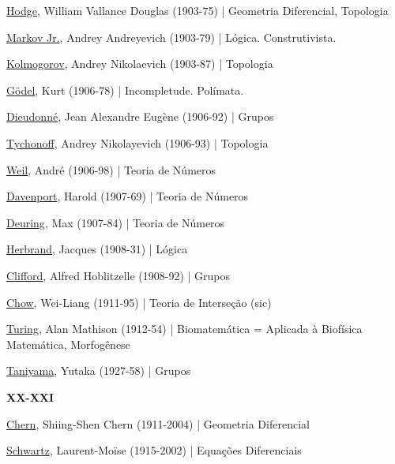 \documentclass[12pt,a4paper]{article}
\begin{document}
			\href{http://en.wikipedia.org/wiki/W._V._D._Hodge}{Hodge}, William Vallance Douglas (1903-75) | Geometria Diferencial, Topologia

			\href{http://en.wikipedia.org/wiki/Andrey_Markov_(Soviet_mathematician)}{Markov Jr.}, Andrey Andreyevich (1903-79) | L\'ogica. Construtivista.

			\href{http://en.wikipedia.org/wiki/Andrey_Kolmogorov}{Kolmogorov}, Andrey Nikolaevich (1903-87) | Topologia

			\href{http://pt.wikipedia.org/wiki/Kurt_G\%C3\%B6del}{Gödel}, Kurt (1906-78) | Incompletude. Pol\'imata.

			\href{http://en.wikipedia.org/wiki/Jean_Dieudonn\%C3\%A9}{Dieudonn\'e}, Jean Alexandre Eugène (1906-92) | Grupos

			\href{http://en.wikipedia.org/wiki/Andrey_Nikolayevich_Tychonoff}{Tychonoff}, Andrey Nikolayevich (1906-93) | Topologia

			\href{http://en.wikipedia.org/wiki/Andr\%C3\%A9_Weil}{Weil}, Andr\'e (1906-98) | Teoria de N\'umeros

			\href{http://en.wikipedia.org/wiki/Harold_Davenport}{Davenport}, Harold (1907-69) | Teoria de N\'umeros

			\href{http://en.wikipedia.org/wiki/Max_Deuring}{Deuring}, Max (1907-84) | Teoria de N\'umeros

			\href{http://en.wikipedia.org/wiki/Herbrand}{Herbrand}, Jacques (1908-31) | L\'ogica

			\href{http://en.wikipedia.org/wiki/Alfred_H._Clifford}{Clifford}, Alfred Hoblitzelle (1908-92) | Grupos

			\href{http://en.wikipedia.org/wiki/Chow\%27s_theorem}{Chow}, Wei-Liang (1911-95) | Teoria de Interse\c{c}\~ao (sic)

			\href{http://en.wikipedia.org/wiki/Alan_Turing}{Turing}, Alan Mathison (1912-54) | Biomatem\'atica = Aplicada \`a Biof\'isica Matem\'atica, Morfog\^enese

			\href{http://en.wikipedia.org/wiki/Yutaka_Taniyama}{Taniyama}, Yutaka (1927-58) | Grupos

			\begin{flushright}
			\end{flushright}

			\textbf{XX-XXI}

			\href{http://en.wikipedia.org/wiki/Chern_class}{Chern}, Shiing-Shen Chern (1911-2004) | Geometria Diferencial

			\href{http://en.wikipedia.org/wiki/Laurent_Schwarz}{Schwartz}, Laurent-Moïse (1915-2002) | Equa\c{c}\~oes Diferenciais
\end{document}
